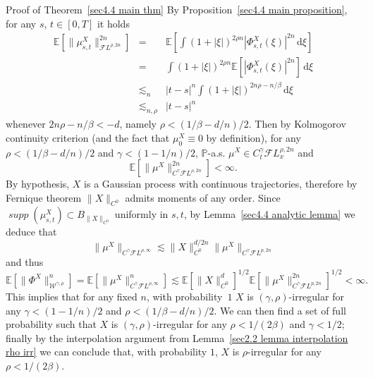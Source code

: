 \documentclass[10pt]{article}
\newcommand{\mathd}{\mathrm{d}}
\newcommand{\tmop}[1]{\ensuremath{\operatorname{#1}}}
\newenvironment{proof*}[1]{\noindent\textbf{#1\ }}{\hspace*{\fill}$\Box$\medskip}
\begin{document}
\begin{proof*}{Proof of Theorem~\ref{sec4.4 main thm}}
  By Proposition~\ref{sec4.4 main proposition}, for any $s$, $t \in [0, T]$ it
  holds
  \begin{eqnarray*}
    \mathbb{E} [\| \mu_{s, t}^X \|_{\mathcal{F} L^{\rho, 2 n}}^{2 n}] & = &
    \mathbb{E} \left[ \int (1 + | \xi |)^{2 \rho n} | \Phi^X_{s, t} (\xi) |^{2
    n} \, \mathd \xi \right]\\
    & = & \int (1 + | \xi |)^{2 \rho n} \mathbb{E} [| \Phi^X_{s, t} (\xi)
    |^{2 n}] \, \mathd \xi\\
    & \lesssim_n & | t - s |^n \int (1 + | \xi |)^{2 n \rho - n / \beta} \,
    \mathd \xi\\
    & \lesssim_{n, \rho} & | t - s |^n
  \end{eqnarray*}
  whenever $2 n \rho - n / \beta < - d$, namely $\rho < (1 / \beta - d / n) /
  2$. Then by Kolmogorov continuity criterion (and the fact that $\mu_0^X
  \equiv 0$ by definition), for any $\rho < (1 / \beta - d / n) / 2$ and
  $\gamma < (1 - 1 / n) / 2$, $\mathbb{P}$-a.s. $\mu^X \in C^{\gamma}_t
  \mathcal{F} L^{\rho, 2 n}_x$ and
  \[ \mathbb{E} [\| \mu^X \|^{2 n}_{C^{\gamma} \mathcal{F} L^{\rho, 2 n}}] <
     \infty . \]
  By hypothesis, $X$ is a Gaussian process with continuous trajectories,
  therefore by Fernique theorem $\| X \|_{C^0}$ admits moments of any order.
  Since $\mathit{\tmop{supp} (\mu^X_{s, t}) \subset B_{\| X \|_{C^0}}}$
  uniformly in $s, t$, by Lemma~\ref{sec4.4 analytic lemma} we deduce that
  \[ \| \mu^X \|_{C^{\gamma} \mathcal{F} L^{\rho, \infty}} \lesssim \| X
     \|_{C^0}^{d / 2 n} \| \mu^X \|_{C^{\gamma} \mathcal{F} L^{p, 2 n}} \]
  and thus
  \[ \mathbb{E} [\| \Phi^X \|_{\mathcal{W}^{\gamma, \rho}}^n] =\mathbb{E} [\|
     \mu^X \|_{C^{\gamma} \mathcal{F} L^{\rho, \infty}}^n] \lesssim \mathbb{E}
     [\| X \|_{C^0}^d]^{1 / 2} \mathbb{E} [\| \mu^X \|_{C^{\gamma} \mathcal{F}
     L^{p, 2 n}}^{2 n}]^{1 / 2} < \infty . \]
  This implies that for any fixed $n$, with probability~$1$ $X$ is $(\gamma,
  \rho)$\mbox{-}irregular for any $\gamma < (1 - 1 / n) / 2$ and $\rho < (1 /
  \beta - d / n) / 2$. We can then find a set of full probability such that
  $X$ is $(\gamma, \rho)$\mbox{-}irregular for any $\rho < 1 / (2 \beta)$ and
  $\gamma < 1 / 2$; finally by the interpolation argument from
  Lemma~\ref{sec2.2 lemma interpolation rho irr} we can conclude that, with
  probability $1$, $X$ is $\rho$\mbox{-}irregular for any $\rho < 1 / (2
  \beta)$.
\end{proof*}
\end{document}
